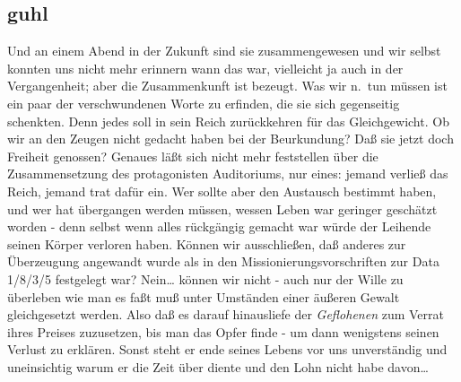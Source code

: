 \documentclass[
]{article}
\author{}
\date{\vspace{-2.5em}}
\begin{document}
\subsection{guhl}\label{guhl}

Und an einem Abend in der Zukunft sind sie zusammengewesen und wir
selbst konnten uns nicht mehr erinnern wann das war, vielleicht ja auch
in der Vergangenheit; aber die Zusammenkunft ist bezeugt. Was wir n.~tun
müssen ist ein paar der verschwundenen Worte zu erfinden, die sie sich
gegenseitig schenkten. Denn jedes soll in sein Reich zurückkehren für
das Gleichgewicht. Ob wir an den Zeugen nicht gedacht haben bei der
Beurkundung? Daß sie jetzt doch Freiheit genossen? Genaues läßt sich
nicht mehr feststellen über die Zusammensetzung des protagonisten
Auditoriums, nur eines: jemand verließ das Reich, jemand trat dafür ein.
Wer sollte aber den Austausch bestimmt haben, und wer hat übergangen
werden müssen, wessen Leben war geringer geschätzt worden - denn selbst
wenn alles rückgängig gemacht war würde der Leihende seinen Körper
verloren haben. Können wir ausschließen, daß anderes zur Überzeugung
angewandt wurde als in den Missionierungsvorschriften zur Data 1/8/3/5
festgelegt war? Nein\ldots{} können wir nicht - auch nur der Wille zu
überleben wie man es faßt muß unter Umständen einer äußeren Gewalt
gleichgesetzt werden. Also daß es darauf hinausliefe der
\emph{Geflohenen} zum Verrat ihres Preises zuzusetzen, bis man das Opfer
finde - um dann wenigstens seinen Verlust zu erklären. Sonst steht er
ende seines Lebens vor uns unverständig und uneinsichtig warum er die
Zeit über diente und den Lohn nicht habe davon\ldots{}
\end{document}
